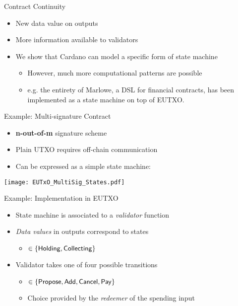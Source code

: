 \begin{frame}{Contract Continuity}
\begin{itemize}
\item New data value on outputs
\item More information available to validators
\item We show that Cardano can model a specific form of state machine
  \begin{itemize}
  \item However, much more computational patterns are possible
  \item e.g. the entirety of \alert{Marlowe}, a DSL for financial contracts, has
been implemented as a state machine on top of EUTXO.
  \end{itemize}
\end{itemize}
\end{frame}

\begin{frame}{Example: Multi-signature Contract}

\begin{itemize}
\item \textbf{n-out-of-m} signature scheme
\item Plain UTXO requires off-chain communication
\item Can be expressed as a simple state machine:
\end{itemize}

\centering
\texttt{[image: EUTxO\_MultiSig\_States.pdf]}

\end{frame}

\begin{frame}{Example: Implementation in EUTXO}

\begin{itemize}
\item State machine is associated to a \textit{validator} function
\item \textit{Data values} in outputs correspond to states
  \begin{itemize}
  \item $\in \{ \mathsf{Holding} , \mathsf{Collecting} \}$
  \end{itemize}
\item Validator takes one of four possible transitions
  \begin{itemize}
  \item $\in \{ \mathsf{Propose} , \mathsf{Add} , \mathsf{Cancel} , \mathsf{Pay} \}$
  \item Choice provided by the \textit{redeemer} of the spending input
  \end{itemize}
\end{itemize}

\end{frame}

